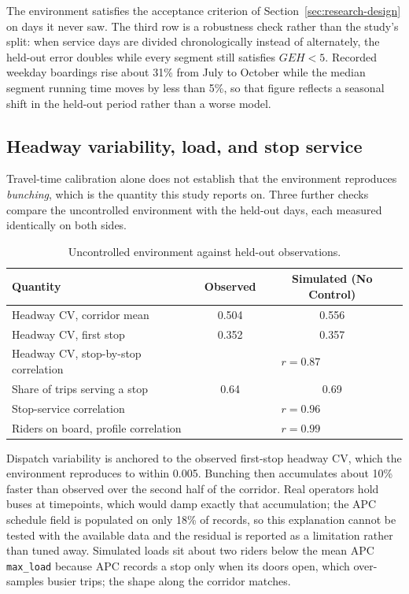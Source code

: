 The environment satisfies the acceptance criterion of Section~\ref{sec:research-design} on days it
never saw. The third row is a robustness check rather than the study's split: when service days are
divided chronologically instead of alternately, the held-out error doubles while every segment still
satisfies $GEH < 5$. Recorded weekday boardings rise about 31\% from July to October while the median
segment running time moves by less than 5\%, so that figure reflects a seasonal shift in the held-out
period rather than a worse model.

\subsection{Headway variability, load, and stop service}

Travel-time calibration alone does not establish that the environment reproduces \emph{bunching}, which
is the quantity this study reports on. Three further checks compare the uncontrolled environment with
the held-out days, each measured identically on both sides.

\begin{table}[htbp]
\centering
\caption[Environment validation]{Uncontrolled environment against held-out observations.}
\label{tab:validation}
\begin{tabular}{lcc}
\toprule
\textbf{Quantity} & \textbf{Observed} & \textbf{Simulated (No Control)} \\
\midrule
Headway CV, corridor mean              & 0.504 & 0.556 \\
Headway CV, first stop                 & 0.352 & 0.357 \\
Headway CV, stop-by-stop correlation   & \multicolumn{2}{c}{$r = 0.87$} \\
Share of trips serving a stop          & 0.64  & 0.69 \\
Stop-service correlation               & \multicolumn{2}{c}{$r = 0.96$} \\
Riders on board, profile correlation   & \multicolumn{2}{c}{$r = 0.99$} \\
\bottomrule
\end{tabular}
\end{table}

Dispatch variability is anchored to the observed first-stop headway CV, which the environment
reproduces to within 0.005. Bunching then accumulates about 10\% faster than observed over the second
half of the corridor. Real operators hold buses at timepoints, which would damp exactly that
accumulation; the APC schedule field is populated on only 18\% of records, so this explanation cannot
be tested with the available data and the residual is reported as a limitation rather than tuned away.
Simulated loads sit about two riders below the mean APC \texttt{max\_load} because APC records a stop
only when its doors open, which over-samples busier trips; the shape along the corridor matches.

